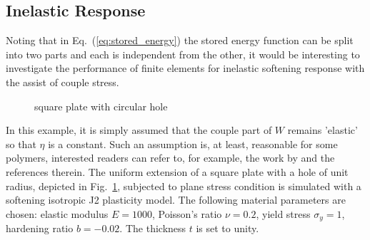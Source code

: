 \documentclass[3p,sort&compress,11pt,fleqn]{elsarticle}
\newcommand*{\figref}[1]{Fig.~\ref{#1}}
\newcommand*{\eqsref}[1]{Eq.~(\ref{#1})}
\begin{document}
\subsection{Inelastic Response}
Noting that in \eqsref{eq:stored_energy} the stored energy function can be split into two parts and each is independent from the other, it would be interesting to investigate the performance of finite elements for inelastic softening response with the assist of couple stress.

\begin{figure}[htb]
\centering\footnotesize
{}
\caption{square plate with circular hole}\label{fig:plate_with_hole}
\end{figure}
In this example, it is simply assumed that the couple part of $W$ remains 'elastic' so that $\eta$ is a constant. Such an assumption is, at least, reasonable for some polymers, interested readers can refer to, for example, the work by \citet{Alisafaei2016} and the references therein. The uniform extension of a square plate with a hole of unit radius, depicted in \figref{fig:plate_with_hole}, subjected to plane stress condition is simulated with a softening isotropic J2 plasticity model. The following material parameters are chosen: elastic modulus $E=\num{1000}$, Poisson's ratio $\nu=\num{0.2}$, yield stress $\sigma_y=\num{1}$, hardening ratio $b=\num{-0.02}$. The thickness $t$ is set to unity.
%
%
%
\end{document}
